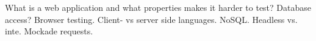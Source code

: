 \label{sec:testing_web}

What is a web application and what properties makes it harder to test?
Database access? Browser testing. Client- vs server side languages.
NoSQL. Headless vs. inte. Mockade requests.

